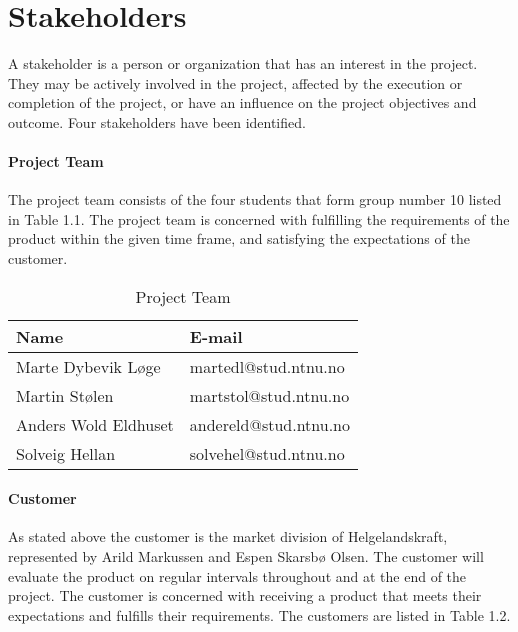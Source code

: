 \section{Stakeholders}

A stakeholder is a person or organization that has an interest in the project. They may be actively involved in the project, affected by the execution or completion of the project, or have an influence on the project objectives and outcome. Four stakeholders have been identified. \cite{stakeholder}


\paragraph{Project Team}

The project team consists of the four students that form group number 10 listed in Table 1.1. The project team is concerned with fulfilling the requirements of the product within the given time frame, and satisfying the expectations of the customer.


\begin{table}[H]
\begin{center}
    \begin{tabular}{| l | l |}
   	\hline
    \rowcolor{gray}
    {\bf Name} & {\bf E-mail} \\ \hline
    Marte Dybevik Løge & martedl@stud.ntnu.no \\ \hline
    Martin Stølen & martstol@stud.ntnu.no \\ \hline
    Anders Wold Eldhuset & andereld@stud.ntnu.no \\ \hline
    Solveig Hellan & solvehel@stud.ntnu.no \\ 
    \hline
    \end{tabular}
\end{center}

\caption{Project Team}
\end{table}

\paragraph{Customer}

As stated above the customer is the market division of Helgelandskraft, represented by Arild Markussen and Espen Skarsbø Olsen. The customer will evaluate the product on regular intervals throughout and at the end of the project. The customer is concerned with receiving a product that meets their expectations and fulfills their requirements. The customers are listed in Table 1.2.

